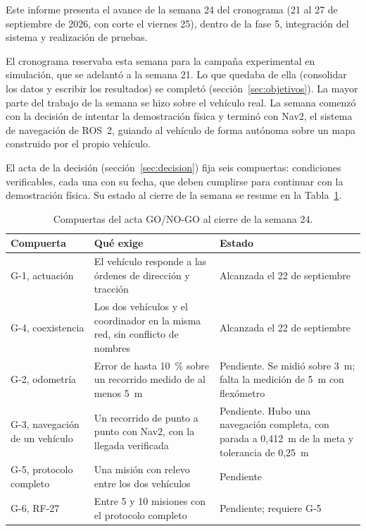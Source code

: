 \documentclass[12pt,letterpaper]{article}
\begin{document}
Este informe presenta el avance de la semana 24 del cronograma (21 al 27 de septiembre de 2026, con corte el viernes 25), dentro de la fase 5, integración del sistema y realización de pruebas.

El cronograma reservaba esta semana para la campaña experimental en simulación, que se adelantó a la semana 21. Lo que quedaba de ella (consolidar los datos y escribir los resultados) se completó (sección~\ref{sec:objetivos}). La mayor parte del trabajo de la semana se hizo sobre el vehículo real. La semana comenzó con la decisión de intentar la demostración física y terminó con Nav2, el sistema de navegación de ROS~2, guiando al vehículo de forma autónoma sobre un mapa construido por el propio vehículo.

El acta de la decisión (sección~\ref{sec:decision}) fija seis compuertas: condiciones verificables, cada una con su fecha, que deben cumplirse para continuar con la demostración física. Su estado al cierre de la semana se resume en la Tabla~\ref{tab:compuertas}.

\begin{table}[H]
    \centering
    \small
    \caption{Compuertas del acta GO/NO-GO al cierre de la semana 24.}
    \label{tab:compuertas}
    \begin{tabular}{@{}p{3.6cm}p{5.4cm}p{5.0cm}@{}}
        \toprule
        \textbf{Compuerta} & \textbf{Qué exige} & \textbf{Estado} \\ \midrule
        G-1, actuación & El vehículo responde a las órdenes de dirección y tracción & Alcanzada el 22 de septiembre \\ \addlinespace
        G-4, coexistencia & Los dos vehículos y el coordinador en la misma red, sin conflicto de nombres & Alcanzada el 22 de septiembre \\ \addlinespace
        G-2, odometría & Error de hasta 10~\% sobre un recorrido medido de al menos 5~m & Pendiente. Se midió sobre 3~m; falta la medición de 5~m con flexómetro \\ \addlinespace
        G-3, navegación de un vehículo & Un recorrido de punto a punto con Nav2, con la llegada verificada & Pendiente. Hubo una navegación completa, con parada a 0,412~m de la meta y tolerancia de 0,25~m \\ \addlinespace
        G-5, protocolo completo & Una misión con relevo entre los dos vehículos & Pendiente \\ \addlinespace
        G-6, RF-27 & Entre 5 y 10 misiones con el protocolo completo & Pendiente; requiere G-5 \\ \bottomrule
    \end{tabular}
\end{table}
\end{document}
